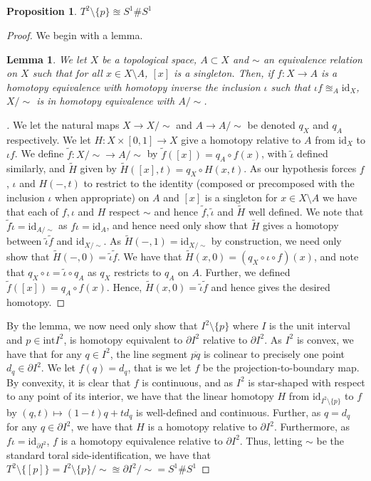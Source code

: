 \documentclass[english]{article}
\newenvironment{subproof}[1][\proofname]{%
	\renewcommand{\qedsymbol}{$\blacksquare$}%
	\begin{proof}[#1]%
	}{%
	\end{proof}%
}
\newcommand{\prt}[1]{\setcounter{subsection}{#1-1}\subsection{}}
\newtheorem*{lemma*}{Lemma}
\newtheorem*{proposition*}{Proposition}
\theoremstyle{remark}
\theoremstyle{definition}
\newcommand{\cl}{\overline}
\newcommand{\id}{\mathrm{id}}
\newcommand{\intr}{\mathrm{int}}
\begin{document}
\prt{3}
\begin{proposition*}
	$T^2\setminus\{p\}\approxeq S^1\# S^1$
\end{proposition*}\begin{proof}
We begin with a lemma.
\begin{lemma*}
	We let $X$ be a topological space, $A\subset X$ and $\sim$ an equivalence relation on $X$ such that for all $x\in X\setminus A$, $[x]$ is a singleton. Then, if $f:X\to A$ is a homotopy equivalence with homotopy inverse the inclusion $\iota$ such that $\iota f\approxeq_A \id_X$, $X/\sim$ is in homotopy equivalence with $A/\sim$.
	\end{lemma*}
\begin{subproof} We let the natural maps $X\to X/\sim$ and $A\to A/\sim$ be denoted $q_X$ and $q_A$ respectively.
	We let $H:X\times [0,1]\to X$ give a homotopy relative to $A$ from $\id_X$ to $\iota f$. 
	We define $\tilde f:X/\sim\to A/\sim$ by $\tilde f([x])=q_A\circ f(x)$, with $\tilde \iota$ defined similarly, and $\tilde H$ given by $\tilde H([x],t)=q_X\circ H(x,t)$. As our hypothesis forces $f$, $\iota$ and $H(-,t)$ to restrict to the identity (composed or precomposed with the inclusion $\iota$ when appropriate) on $A$ and $[x]$ is a singleton for $x\in X\setminus A$ we have that each of $f,\iota$ and $H$ respect $\sim$ and hence $\tilde f, \tilde \iota $ and $\tilde H$ well defined. We note that $\tilde{f}\tilde{\iota}=\id_{A/\sim}$ as $f\iota=\id_A$, and hence need only show that $\tilde H$ gives a homotopy between $\tilde \iota \tilde f$ and $\id_{X/\sim}$. As $\tilde H(-,1)=\id_{X/\sim}$ by construction, we need only show that $\tilde H(-,0)=\tilde \iota \tilde f$. We have that $\tilde H(x,0)=(q_X\circ \iota \circ f)(x)$, and note that $q_X\circ \iota=\tilde\iota \circ q_A$ as $q_X$ restricts to $ q_A$ on $A$. Further, we defined $\tilde f([x])=q_A\circ f(x)$. Hence, $\tilde H(x,0)=\tilde \iota \tilde f$ and hence gives the desired homotopy. 
\end{subproof}
By the lemma, we now need only show that $I^2\setminus \{p\}$ where $I$ is the unit interval and $p\in \intr I^2$, is homotopy equivalent to $\partial I^2$ relative to $\partial I^2$. As $I^2$ is convex, we have that for any $q\in I^2$, the line segment $\cl{pq}$ is colinear to precisely one point $d_q\in \partial I^2$. We let $f(q)=d_q$, that is we let $f$ be the projection-to-boundary map. By convexity, it is clear that $f$ is continuous, and as $I^2$ is star-shaped with respect to any point of its interior, we have that the linear homotopy $H$ from $\id_{I^2\setminus\{p\}}$ to $f$ by $(q,t)\mapsto (1-t)q+td_q$ is well-defined and continuous. Further, as $q=d_q$ for any $q\in \partial I^2$, we have that $H$ is a homotopy relative to $\partial I^2$. Furthermore, as $f\iota=\id_{\partial I^2}$, $f$ is a homotopy equivalence relative to $\partial I^2$. Thus, letting $\sim$ be the standard toral side-identification, we have that $T^2\setminus \{[p]\}=I^2\setminus \{p\}/\sim\approxeq \partial I^2/\sim=S^1\#S^1$ \end{proof} 
\end{document}
